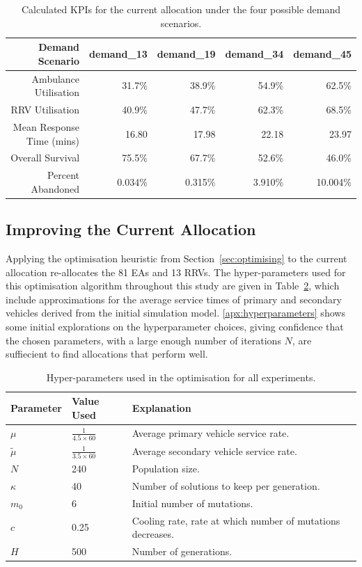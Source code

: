 \documentclass[preprint,12pt]{elsarticle}
\begin{document}
\begin{table}
\begin{center}
\small
\begin{tabular}{rrrrr}
\toprule
Demand Scenario & \textbf{demand\_13} & \textbf{demand\_19} & \textbf{demand\_34} & \textbf{demand\_45} \\
\midrule
Ambulance Utilisation & 31.7\% & 38.9\% & 54.9\% & 62.5\% \\
RRV Utilisation & 40.9\% & 47.7\% & 62.3\% & 68.5\% \\
Mean Response Time (mins) & 16.80 & 17.98 & 22.18 & 23.97 \\
Overall Survival & 75.5\% & 67.7\% & 52.6\% & 46.0\% \\
Percent Abandoned & 0.034\% & 0.315\% & 3.910\% & 10.004\% \\
\bottomrule
\end{tabular}
\caption{Calculated KPIs for the current allocation under the four possible
         demand scenarios.}
\label{tbl:demand_results}
\end{center}
\end{table}


\subsection{Improving the Current Allocation}\label{sec:improve_current}
Applying the optimisation heuristic from Section~\ref{sec:optimising} to the
current allocation re-allocates the 81 EAs and 13 RRVs. The hyper-parameters
used for this optimisation algorithm throughout this study are given in
Table~\ref{tbl:hyperparameters}, which include approximations for the average
service times of primary and secondary vehicles derived from the initial
simulation model. \ref{apx:hyperparameters} shows some initial explorations on
the hyperparameter choices, giving confidence that the chosen parameters, with
a large enough number of iterations $N$, are suffiecient to find allocations
that perform well.

\begin{table}
\begin{tabular}{lll}
\toprule
Parameter & Value Used & Explanation \\
\midrule
$\mu$ & $\frac{1}{4.5 \times 60}$ & Average primary vehicle service rate.\\
$\tilde{\mu}$ & $\frac{1}{3.5 \times 60}$ & Average secondary vehicle service rate.\\
$N$ & 240 & Population size.\\
$\kappa$ & 40 & Number of solutions to keep per generation.\\
$m_0$ & 6 & Initial number of mutations.\\
$c$ & 0.25 & Cooling rate, rate at which number of mutations decreases.\\
$H$ & 500 & Number of generations.\\
\bottomrule
\end{tabular}
\caption{Hyper-parameters used in the optimisation for all experiments.}
\label{tbl:hyperparameters}
\end{table}
\end{document}
